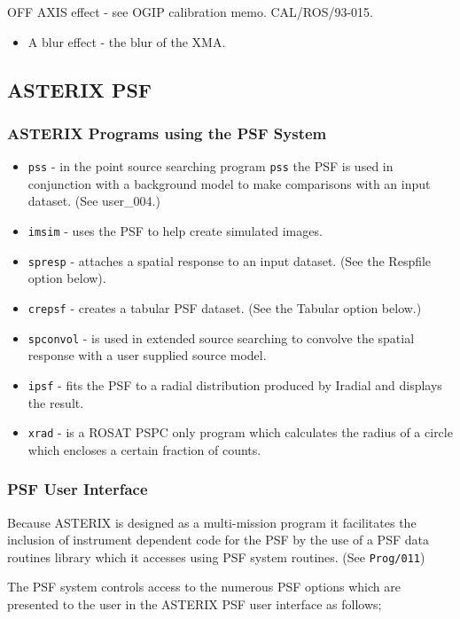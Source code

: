 \documentclass[11pt,fleqn]{article}    %
\begin{document}
OFF AXIS effect - see OGIP calibration memo. CAL/ROS/93-015.
\begin{itemize}
\item A blur effect - the blur of the XMA.
\end{itemize}

\subsection{ASTERIX PSF}
\subsubsection{ASTERIX Programs using the PSF System}
\begin{itemize}
\item {\tt pss} - in the point source searching program {\tt pss} the PSF is used in conjunction with a background model to make comparisons with an input dataset. (See user_004.)
\item {\tt imsim} - uses the PSF to help create simulated images.
\item {\tt spresp} - attaches a spatial response to an input dataset. (See the Respfile option below).
\item {\tt crepsf} - creates a tabular PSF dataset. (See the Tabular  option below.)
\item {\tt spconvol} - is used in extended source searching to convolve the spatial response with a user supplied source model.
\item {\tt ipsf} - fits the PSF to a radial distribution produced by Iradial and displays the result.
\item {\tt xrad} - is a ROSAT PSPC only program which calculates the radius of a circle which encloses a certain fraction of counts. 
\end{itemize}

\subsubsection {PSF User Interface}

Because ASTERIX  is designed  as a multi-mission program it  facilitates the
inclusion  of instrument dependent code  for the PSF by  the use  of a PSF data
routines  library which  it  accesses   using  PSF system  routines.   (See
{\tt Prog/011})

The PSF system controls access to the numerous PSF options which are
presented to the user in the ASTERIX PSF user interface as follows;
\end{document}
